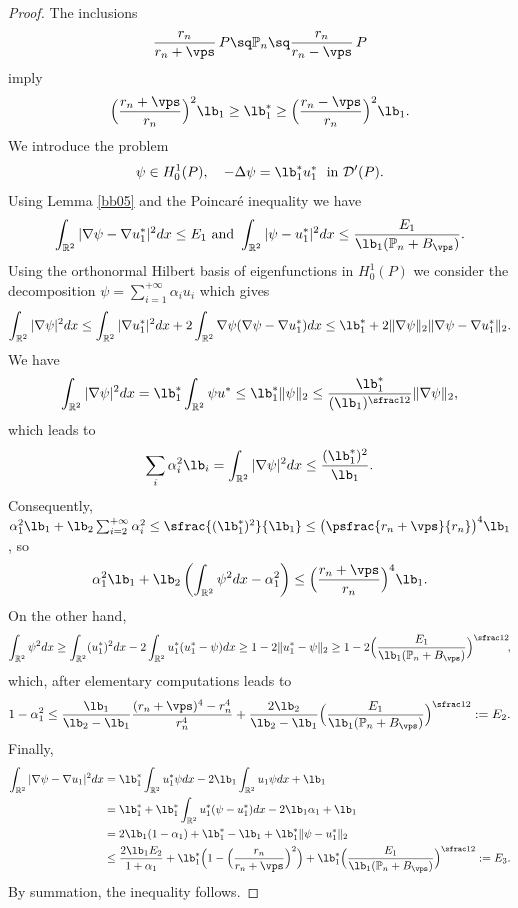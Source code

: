 \begin{proof}
The inclusions
\[
\frac{r_n}{r_n+\vps}\, P \sq \Bbb P_n \sq \frac{r_n}{r_n-\vps}\, P
\]
imply
\[
\Big (\frac{r_n+\vps} {r_n}\Big)^2\lb_1\ge \lb_1^* \ge \Big (\frac{r_n-\vps} {r_n}\Big)^2\lb_1.
\]
We introduce the problem
\[
\psi \in H^1_0(P),\quad -\Delta \psi = \lb_1^* u_1^* \ \mbox{ in } {\mathcal D'}(P).
\]
Using Lemma \ref{bb05} and the Poincaré inequality we have
\[
\int_{\Bbb{R}^2} |\nabla \psi -\nabla u_1^*|^2 dx \le E_1 \text{ and } \int_{\Bbb{R}^2} | \psi - u_1^*|^2 dx\le \frac{E_1}{\lb_1(\Bbb P_n+ B_\vps)}.
\]
Using the orthonormal Hilbert basis of eigenfunctions in $H^1_0(P)$ we consider the decom\-position
$\psi=\sum_{i=1}^{+\infty} \alpha_i u_i$ which gives
\[
\int_{\Bbb{R}^2} |\nabla \psi |^2 dx \le \int_{\Bbb{R}^2} |\nabla u_1^* |^2 dx + 2 \int_{\Bbb{R}^2} \nabla \psi (\nabla \psi -\nabla u_1^*) dx\le \lb_1^*+ 2 \|\nabla \psi\|_2 \|\nabla \psi-\nabla u_1^*\|_2.
\]
We have
\[
\int_{\Bbb{R}^2} |\nabla \psi |^2 dx = \lb_1^* \int_{\Bbb{R}^2} \psi u^*\le \lb_1^* \|\psi \|_2\le \frac{\lb_1^*}{(\lb_1)^{\sfrac 12}} \|\nabla \psi \|_2,
\]
which leads to
\[
\sum_i \alpha_i^2 \lb_i = \int_{\Bbb{R}^2} |\nabla \psi |^2 dx \le \frac{(\lb_1^*)^2}{\lb_1 }.
\]
Consequently,
$\alpha_1^2 \lb_1 + \lb_2 \sum _{i=2}^{+\infty} \alpha_i^2\le \sfrac{(\lb_1^*)^2}{\lb_1 }\le\big (\psfrac{r_n+\vps} {r_n}\big)^4\lb_1$,
so
\[
\alpha_1^2 \lb_1 + \lb_2 \left(\int_{\Bbb{R}^2} \psi^2dx -\alpha_1^2\right) \le \Bigl(\frac{r_n+\vps} {r_n}\Bigr)^4\lb_1.
\]
On the other hand,
\[
\int_{\Bbb{R}^2} \psi^2dx \ge \int_{\Bbb{R}^2} (u_1^*)^2 dx- 2 \int_{\Bbb{R}^2} u_1^*(u_1^*-\psi) dx \ge 1-2\|u_1^*-\psi\|_2 \ge 1-2\Bigl(\frac{E_1}{\lb_1(\mathbb P_n+ B_\vps)}\Bigr)^{\sfrac12}\!,
\]
which, after elementary computations leads to
\[
1-\alpha_1^2 \le \frac{\lb_1}{\lb_2-\lb_1}\frac{(r_n+\vps)^4-r_n^4}{r_n^4} + \frac{2\lb_2}{\lb_2-\lb_1}\Bigl(\frac{E_1}{\lb_1(\mathbb P_n+ B_\vps)}\Bigr)^{\sfrac12}:= E_2.
\]
Finally,
\begin{align*}
\int_{\Bbb{R}^2}|\nabla \psi -\nabla u_1 |^2 dx &= \lb_1^*\int_{\Bbb{R}^2} u_1^* \psi dx -2\lb_1\int_{\Bbb{R}^2} u_1 \psi dx+ \lb_1
\\
&=\lb_1^*+ \lb_1^*\int_{\Bbb{R}^2} u_1^* (\psi -u_1^*)dx-2\lb_1 \alpha_1+ \lb_1
\\
&= 2 \lb_1(1-\alpha_1)+ \lb_1^*-\lb_1+ \lb_1^* \|\psi -u_1^*\|_2
\\
&\le \frac{2 \lb_1 E_2}{1+\alpha_1}+\lb_1^*\Bigl(1- \Bigl(\frac{r_n}{r_n+\vps }\Bigr)^2\Bigr)+\lb_1^* \Bigl(\frac{E_1}{\lb_1(\mathbb P_n+ B_\vps)}\Bigr)^{\sfrac12}:=E_3.
\end{align*}
By summation, the inequality follows.
\end{proof}
